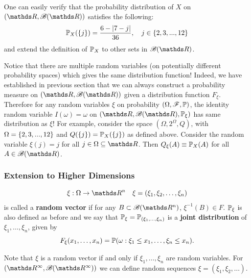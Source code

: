 \begin{example} One can easily verify that the probability  distribution of $X$ on $(\R, \B(\R))$ satisfies the following:
\begin{equation*}
    \mathbb{P}_X(\left\{ j \right \}) = \frac{6-|7-j|}{36}, \quad j \in \left\{ 2,3,...,12 \right \}
\end{equation*}
and extend the definition of $\mathbb{P}_X$ to other sets in $\B(\R)$.
\end{example}

Notice that there are multiple random variables (on potentially different probability spaces) which gives the same distribution function! Indeed, we have established in previous section that we can always construct a probability measure on $(\R, \B(\R))$ given a distribution function $F_\xi$. Therefore for any random variables $\xi$ on probability $(\Omega, \mathcal{F}, \mathbb{P})$, the identity random variable $I(\omega)=\omega$ on $(\R, \B(\R), \p_\xi)$ has same distribution as $\xi$! For example, consider the space $(\Omega, 2^{\Omega}, Q)$, with $\Omega = \left\{ 2,3,...,12 \right \}$ and $Q(\left\{ j \right \}) = \mathbb{P}_X(\left\{ j \right \})$ as defined above. Consider the random variable $\xi(j) = j$ for all $j \in \Omega \subseteq \R$. Then $Q_\xi(A) \equiv \mathbb{P}_X(A)$ for all $A \in \B(\R)$. 

\subsubsection{Extension to Higher Dimensions}
\begin{definition}[Extension to $(\R^n, \B(\R^n))$]
\begin{equation*}
    \xi: \Omega \rightarrow \R^n \quad \xi = (\xi_1, \xi_2, \dots, \xi_n)
\end{equation*}
is called a \textbf{random vector} if for any $B \subset \B(\R^n)$, $\xi^{-1}(B) \in F$. $\mathbb{P}_\xi$ is also defined as before and we say that $\mathbb{P}_\xi = \mathbb{P}_{(\xi_1,\dots,\xi_n)}$ is a \textbf{joint distribution} of $\xi_1, \dots, \xi_n$, given by
\begin{equation*}
    F_\xi(x_1, \dots, x_n) = \mathbb{P}(\omega: \xi_1 \le x_1, \dots, \xi_n \le x_n).
\end{equation*}
\end{definition}
Note that $\xi$ is a random vector if and only if $\xi_1, \dots, \xi_n$ are random variables. For $(\R^\infty, \B(\R^\infty))$ we can define random sequences $\xi = (\xi_1, \xi_2, \dots)$.
\newpage
